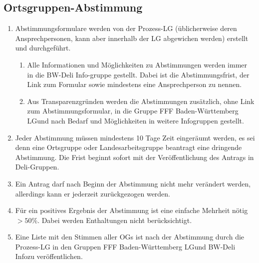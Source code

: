 \documentclass[a4paper,
  ]{scrartcl}
\begin{document}
\subsection{Ortsgruppen-Abstimmung}
\begin{enumerate}
      \item Abstimmungsformulare werden von der Prozess-LG (üblicherweise deren Ansprechpersonen, kann
            aber innerhalb der LG abgewichen werden) erstellt und durchgeführt.
            \begin{enumerate}
                  \item Alle Informationen und Möglichkeiten zu Abstimmungen werden immer in die \glqq{}BW-Deli Info\grqq-gruppe gestellt. Dabei ist die Abstimmungsfrist, der Link zum Formular
                        sowie mindestens eine Ansprechperson zu nennen.
                  \item Aus Transparenzgründen werden die Abstimmungen zusätzlich, ohne Link zum
                        Abstimmungsformular, in die Gruppe \glqq{}FFF Baden-Württemberg LG\grqq und nach Bedarf und
                        Möglichkeiten in weitere Infogruppen gestellt.
            \end{enumerate}

      \item Jeder Abstimmung müssen mindestens 10 Tage Zeit eingeräumt werden, es sei denn eine
            Ortsgruppe oder Landesarbeitsgruppe beantragt eine dringende Abstimmung. Die Frist beginnt
            sofort mit der Veröffentlichung des Antrags in Deli-Gruppen.
      \item Ein Antrag darf nach Beginn der Abstimmung nicht mehr verändert werden, allerdings kann er
            jederzeit zurückgezogen werden.
      \item Für ein positives Ergebnis der Abstimmung ist eine einfache Mehrheit nötig \(>50\%\). Dabei werden
            Enthaltungen nicht berücksichtigt.
      \item Eine Liste mit den Stimmen aller OGs ist nach der Abstimmung durch die Prozess-LG
            in den Gruppen \glqq{}FFF Baden-Württemberg LG\grqq und \glqq{}BW-Deli Info\grqq zu veröffentlichen.
\end{enumerate}
\end{document}
